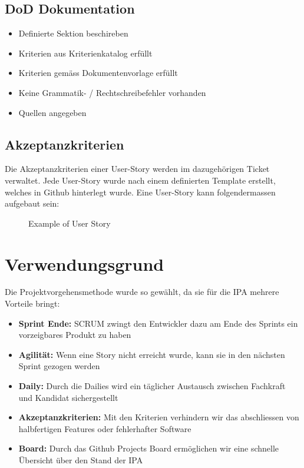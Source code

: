 \subsection{DoD Dokumentation}

\begin{itemize}
    \item Definierte Sektion beschireben
    \item Kriterien aus Kriterienkatalog erfüllt
    \item Kriterien gemäss Dokumentenvorlage erfüllt
    \item Keine Grammatik- / Rechtschreibefehler vorhanden
    \item Quellen angegeben
\end{itemize}

\subsection{Akzeptanzkriterien}
Die Akzeptanzkriterien einer User-Story werden im dazugehörigen Ticket verwaltet. Jede User-Story wurde nach einem definierten Template
erstellt, welches in Github hinterlegt wurde. Eine User-Story kann folgendermassen aufgebaut sein:

\begin{figure}[h]
    \centering
    \caption{Example of User Story}
\end{figure}

\section{Verwendungsgrund}
Die Projektvorgehensmethode wurde so gewählt, da sie für die IPA mehrere Vorteile bringt:

\begin{itemize}
    \item \textbf{Sprint Ende:} SCRUM zwingt den Entwickler dazu am Ende des Sprints ein vorzeigbares Produkt zu haben
    \item \textbf{Agilität:} Wenn eine Story nicht erreicht wurde, kann sie in den nächsten Sprint gezogen werden
    \item \textbf{Daily:} Durch die Dailies wird ein täglicher Austausch zwischen Fachkraft und Kandidat sichergestellt
    \item \textbf{Akzeptanzkriterien:} Mit den Kriterien verhindern wir das abschliessen von halbfertigen Features oder fehlerhafter Software
    \item \textbf{Board:} Durch das Github Projects Board ermöglichen wir eine schnelle Übersicht über den Stand der IPA
\end{itemize}

